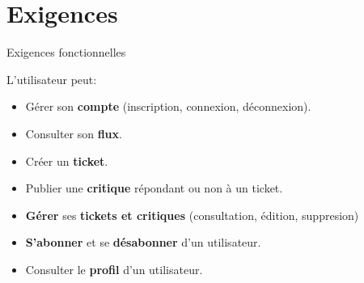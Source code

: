 \section{Exigences}

\begin{frame}{Exigences fonctionnelles}
  \begin{block}{L'utilisateur peut:}
    \begin{itemize}
    \item Gérer son \textbf{compte} {\tiny(inscription, connexion, déconnexion)}.
    \item Consulter son \textbf{flux}.
    \item Créer un \textbf{ticket}.
    \item Publier une \textbf{critique} répondant ou non à un ticket.
    \item \textbf{Gérer} ses \textbf{tickets et critiques} {\tiny (consultation, édition, suppresion)}
    \item \textbf{S'abonner} et se \textbf{désabonner} d'un utilisateur.
    \item Consulter le \textbf{profil} d'un utilisateur.
    \end{itemize}    
  \end{block}
\end{frame}
